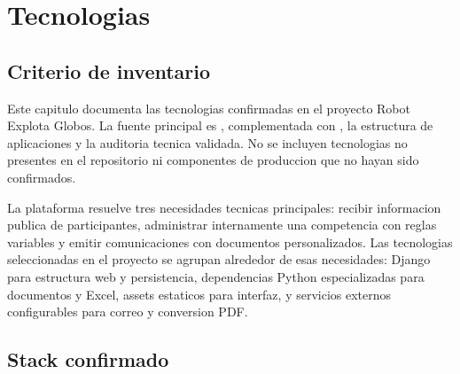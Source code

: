 \chapter{Tecnologias}
\label{chap:tecnologias}

\section{Criterio de inventario}
\label{sec:tecnologias-criterio}

Este capitulo documenta las tecnologias confirmadas en el proyecto Robot Explota Globos. La fuente principal es , complementada con , la estructura de aplicaciones y la auditoria tecnica validada. No se incluyen tecnologias no presentes en el repositorio ni componentes de produccion que no hayan sido confirmados.

La plataforma resuelve tres necesidades tecnicas principales: recibir informacion publica de participantes, administrar internamente una competencia con reglas variables y emitir comunicaciones con documentos personalizados. Las tecnologias seleccionadas en el proyecto se agrupan alrededor de esas necesidades: Django para estructura web y persistencia, dependencias Python especializadas para documentos y Excel, assets estaticos para interfaz, y servicios externos configurables para correo y conversion PDF.

\section{Stack confirmado}
\label{sec:tecnologias-stack}

